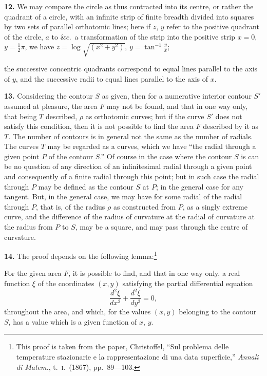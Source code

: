 \documentclass[11pt,a4paper]{article}
\begin{document}
\textbf{12.} We may compare the circle as thus contracted into its centre, or rather the quadrant of a circle, with an infinite strip of finite breadth divided into squares by two sets of parallel orthotomic lines; here if $z$, $y$ refer to the positive quadrant of the circle, $a$ to $\&c$.\ a transformation of the strip into the positive strip $x = 0$, $y = \frac{1}{2}\pi$, we have $z = \log\sqrt{(x^2 + y^2)}$, $y = \tan^{-1}\frac{y}{x}$;

the successive concentric quadrants correspond to equal lines parallel to the axis of $y$, and the successive radii to equal lines parallel to the axis of $x$.

\textbf{13.} Considering the contour $S$ as given, then for a numerative interior contour $S'$ assumed at pleasure, the area $F$ may not be found, and that in one way only, that being $T$ described, $\rho$ as orthotomic curves; but if the curve $S'$ does not satisfy this condition, then it is not possible to find the area $F$ described by it as $T$. The number of contours is in general not the same as the number of radials. The curves $T$ may be regarded as a curves, which we have ``the radial through a given point $P$ of the contour $S$.'' Of course in the case where the contour $S$ is can be no question of any direction of an infinitesimal radial through a given point and consequently of a finite radial through this point; but in such case the radial through $P$ may be defined as the contour $S$ at $P$; in the general case for any tangent. But, in the general case, we may have for some radial of the radial through $P$, that is, of the radius $\rho$ as constructed from $P$, as a singly extreme curve, and the difference of the radius of curvature at the radial of curvature at the radius from $P$ to $S$, may be a square, and may pass through the centre of curvature.

\textbf{14.} The proof depends on the following lemma:\footnote{This proof is taken from the paper, Christoffel, ``Sul problema delle temperature stazionarie e la rappresentazione di una data superficie,'' \textit{Annali di Matem.}, t.\ \textsc{i}.\ (1867), pp.\ 89---103.}

For the given area $F$, it is possible to find, and that in one way only, a real function $\xi$ of the coordinates $(x, y)$ satisfying the partial differential equation
\[
\frac{d^2 \xi}{d x^2} + \frac{d^2 \xi}{d y^2} = 0,
\]
throughout the area, and which, for the values $(x, y)$ belonging to the contour $S$, has a value which is a given function of $x$, $y$.
\end{document}
